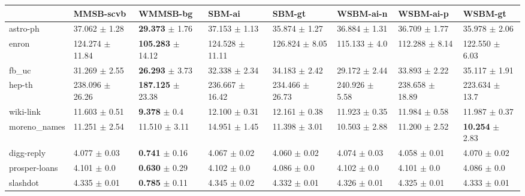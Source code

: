\begin{tabular}{llllllll}
\hline
               & MMSB-scvb             & WMMSB-bg                   & SBM-ai              & SBM-gt              & WSBM-ai-n          & WSBM-ai-p           & WSBM-gt                    \\
\hline
 astro-ph      & 37.062 $\pm$ 1.28   & \textbf{29.373} $\pm$ 1.76   & 37.153 $\pm$ 1.13   & 35.874 $\pm$ 1.27   & 36.884 $\pm$ 1.31  & 36.709 $\pm$ 1.77   & 35.978 $\pm$ 2.06          \\
 enron         & 124.274 $\pm$ 11.84 & \textbf{105.283} $\pm$ 14.12 & 124.528 $\pm$ 11.11 & 126.824 $\pm$ 8.05  & 115.133 $\pm$ 4.0  & 112.288 $\pm$ 8.14  & 122.550 $\pm$ 6.03         \\
 fb\_uc         & 31.269 $\pm$ 2.55   & \textbf{26.293} $\pm$ 3.73   & 32.338 $\pm$ 2.34   & 34.183 $\pm$ 2.42   & 29.172 $\pm$ 2.44  & 33.893 $\pm$ 2.22   & 35.117 $\pm$ 1.91          \\
 hep-th        & 238.096 $\pm$ 26.26 & \textbf{187.125} $\pm$ 23.38 & 236.667 $\pm$ 16.42 & 234.466 $\pm$ 26.73 & 240.926 $\pm$ 5.58 & 238.658 $\pm$ 18.89 & 223.634 $\pm$ 13.7         \\
 wiki-link     & 11.603 $\pm$ 0.51   & \textbf{9.378} $\pm$ 0.4     & 12.100 $\pm$ 0.31   & 12.161 $\pm$ 0.38   & 11.923 $\pm$ 0.35  & 11.984 $\pm$ 0.58   & 11.987 $\pm$ 0.37          \\
 moreno\_names  & 11.251 $\pm$ 2.54   & 11.510 $\pm$ 3.11            & 14.951 $\pm$ 1.45   & 11.398 $\pm$ 3.01   & 10.503 $\pm$ 2.88  & 11.200 $\pm$ 2.52   & \textbf{10.254} $\pm$ 2.83 \\
 digg-reply    & 4.077 $\pm$ 0.03    & \textbf{0.741} $\pm$ 0.16    & 4.067 $\pm$ 0.02    & 4.060 $\pm$ 0.02    & 4.074 $\pm$ 0.03   & 4.058 $\pm$ 0.01    & 4.070 $\pm$ 0.02           \\
 prosper-loans & 4.101 $\pm$ 0.0     & \textbf{0.630} $\pm$ 0.29    & 4.102 $\pm$ 0.0     & 4.086 $\pm$ 0.0     & 4.102 $\pm$ 0.0    & 4.101 $\pm$ 0.0     & 4.086 $\pm$ 0.0            \\
 slashdot      & 4.335 $\pm$ 0.01    & \textbf{0.785} $\pm$ 0.11    & 4.345 $\pm$ 0.02    & 4.332 $\pm$ 0.01    & 4.326 $\pm$ 0.01   & 4.325 $\pm$ 0.01    & 4.333 $\pm$ 0.01           \\
\hline
\end{tabular}
